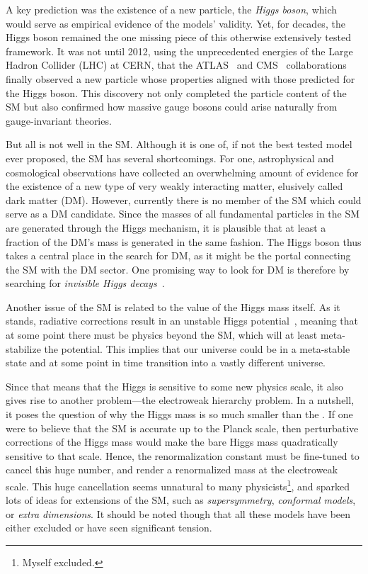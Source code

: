 A key prediction was the existence of a new particle, the \textit{Higgs boson}, which would serve as empirical evidence of the models' validity. Yet, for decades, the Higgs boson remained the one missing piece of this otherwise extensively tested framework. It was not until 2012, using the unprecedented energies of the Large Hadron Collider (\acs{LHC}) at CERN, that the ATLAS~\cite{ATLAS:2012yve} and CMS~\cite{CMS:2012qbp} collaborations finally observed a new particle whose properties aligned with those predicted for the Higgs boson. This discovery not only completed the particle content of the \acs{SM} but also confirmed how massive gauge bosons could arise naturally from gauge-invariant theories.

But all is not well in the \acs{SM}. Although it is one of, if not the best tested model ever proposed, the \acs{SM} has several shortcomings. For one, astrophysical and cosmological observations have collected an overwhelming amount of evidence for the existence of a new type of very weakly interacting matter, elusively called dark matter (\acs{DM}). However, currently there is no member of the \acs{SM} which could serve as a \acs{DM} candidate. Since the masses of all fundamental particles in the \acs{SM} are generated through the Higgs mechanism, it is plausible that at least a fraction of the \acs{DM}'s mass is generated in the same fashion. The Higgs boson thus takes a central place in the search for \acs{DM}, as it might be the portal connecting the \acs{SM} with the \acs{DM} sector. One promising way to look for \acs{DM} is therefore by searching for \textit{invisible Higgs decays}~\cite{ATLAS:2017nyv, CMS:2016dhk}.

Another issue of the \acs{SM} is related to the value of the Higgs mass itself. As it stands, radiative corrections result in an unstable Higgs potential~\cite{Degrassi:2012ry}, meaning that at some point there must be physics beyond the \acs{SM}, which will at least meta-stabilize the potential. This implies that our universe could be in a meta-stable state and at some point in time transition into a vastly different universe.

Since that means that the Higgs is sensitive to some new physics scale, it also gives rise to another problem---the electroweak hierarchy problem. In a nutshell, it poses the question of why the Higgs mass is so much smaller than the . If one were to believe that the \acs{SM} is accurate up to the Planck scale, then perturbative corrections of the Higgs mass would make the bare Higgs mass quadratically sensitive to that scale. Hence, the renormalization constant must be fine-tuned to cancel this huge number, and render a renormalized mass at the electroweak scale. This huge cancellation seems unnatural to many physicists\footnote{Myself excluded.}, and sparked lots of ideas for extensions of the \acs{SM}, such as \textit{supersymmetry}, \textit{conformal models}, or \textit{extra dimensions}. It should be noted though that all these models have been either excluded or have seen significant tension.

